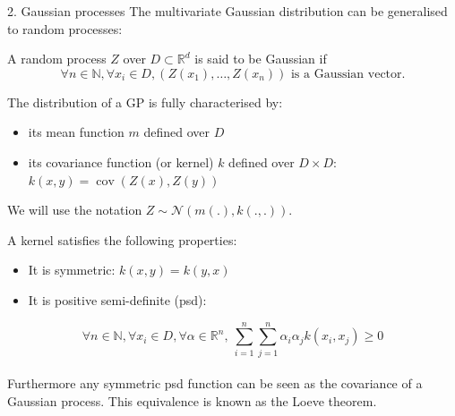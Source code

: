 \documentclass{beamer}
\DeclareMathOperator*{\Cov}{cov}
\begin{document}

\begin{frame}{2. Gaussian processes}
The multivariate Gaussian distribution can be generalised to random processes: 
\begin{definition}
A random process $Z$ over $D \subset \mathds{R}^d$ is said to be Gaussian if 
\begin{equation*}
\forall n \in \mathds{N}, \forall x_i \in D, (Z(x_1),\dots,Z(x_n)) \text{  is a Gaussian vector}.
\end{equation*} 
\end{definition}
The distribution of a GP is fully characterised by:
\begin{itemize}
	\item its mean function $m$ defined over $D$ 
	\item its covariance function (or kernel) $k$ defined over $D \times D$: $k(x,y) = \Cov(Z(x),Z(y))$
\end{itemize}
We will use the notation $Z \sim \mathcal{N}(m(.),k(.,.))$.
\end{frame}

\begin{frame}{}
A kernel satisfies the following properties:
\begin{itemize}
	\item It is symmetric: $k(x,y) = k(y,x)$
	\item It is positive semi-definite (psd):
\end{itemize}
\begin{equation*}
	\forall n \in \mathds{N}, \forall x_i \in D, \forall \alpha \in \mathds{R}^n,\  \sum_{i=1}^n \sum_{j=1}^n \alpha_i \alpha_j k(x_i,x_j) \geq 0
\end{equation*}
\vspace{5mm} \\
Furthermore any symmetric psd function can be seen as the covariance of a Gaussian process. This equivalence is known as the Loeve theorem.
\end{frame}
\end{document}
